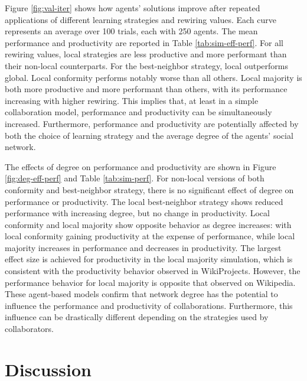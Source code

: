 Figure \ref{fig:val-iter} shows how agents' solutions improve after repeated applications of
different learning strategies and rewiring values.
Each curve represents an average over 100 trials, each with 250 agents.
The mean performance and productivity are reported in Table \ref{tab:sim-eff-perf}.
For all rewiring values, local strategies are less productive and more performant
than their non-local counterparts.
For the best-neighbor strategy, local outperforms global.
Local conformity performs notably worse than all others.
Local majority is both more productive and more performant than others,
with its performance increasing with higher rewiring.
This implies that,
at least in a simple collaboration model,
performance and productivity can be simultaneously increased.
Furthermore, performance and productivity are potentially affected by both the choice of
learning strategy and the average degree of the agents' social network.

The effects of degree on performance and productivity are shown in Figure \ref{fig:deg-eff-perf} and
Table \ref{tab:sim-perf}.
For non-local versions of both conformity and best-neighbor strategy,
there is no significant effect of degree on performance or productivity.
The local best-neighbor strategy shows reduced performance with increasing degree,
but no change in productivity.
Local conformity and local majority show opposite behavior as degree increases:
with local conformity gaining productivity at the expense of performance,
while local majority increases in performance and decreases in productivity.
The largest effect size is achieved for productivity in the local majority simulation,
which is consistent with the productivity behavior observed in WikiProjects.
However, the performance behavior for local majority is opposite that observed on
Wikipedia.
These agent-based models confirm that network degree has the potential to influence
the performance and productivity of collaborations.
Furthermore, this influence can be drastically different depending on the strategies
used by collaborators.

\section{Discussion}
\label{sec:discuss}

